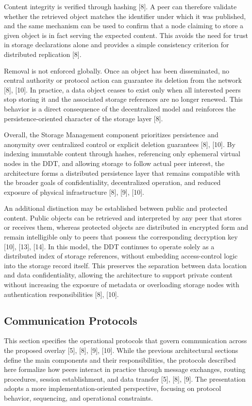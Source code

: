 \documentclass[12pt,a4paper]{article}
\begin{document}
Content integrity is verified through hashing [8]. A peer can therefore validate whether the retrieved object matches the identifier under which it was published, and the same mechanism can be used to confirm that a node claiming to store a given object is in fact serving the expected content. This avoids the need for trust in storage declarations alone and provides a simple consistency criterion for distributed replication [8].

Removal is not enforced globally. Once an object has been disseminated, no central authority or protocol action can guarantee its deletion from the network [8], [10]. In practice, a data object ceases to exist only when all interested peers stop storing it and the associated storage references are no longer renewed. This behavior is a direct consequence of the decentralized model and reinforces the persistence-oriented character of the storage layer [8].

Overall, the Storage Management component prioritizes persistence and anonymity over centralized control or explicit deletion guarantees [8], [10]. By indexing immutable content through hashes, referencing only ephemeral virtual nodes in the DDT, and allowing storage to follow actual peer interest, the architecture forms a distributed persistence layer that remains compatible with the broader goals of confidentiality, decentralized operation, and reduced exposure of physical infrastructure [8], [9], [10].

An additional distinction may be established between public and protected content. Public objects can be retrieved and interpreted by any peer that stores or receives them, whereas protected objects are distributed in encrypted form and remain intelligible only to peers that possess the corresponding decryption key [10], [13], [14]. In this model, the DDT continues to operate solely as a distributed index of storage references, without embedding access-control logic into the storage record itself. This preserves the separation between data location and data confidentiality, allowing the architecture to support private content without increasing the exposure of metadata or overloading storage nodes with authentication responsibilities [8], [10].

\subsection{Communication Protocols}

This section specifies the operational protocols that govern communication across the proposed overlay [5], [8], [9], [10]. While the previous architectural sections define the main components and their responsibilities, the protocols described here formalize how peers interact in practice through message exchanges, routing procedures, session establishment, and data transfer [5], [8], [9]. The presentation adopts a more implementation-oriented perspective, focusing on protocol behavior, sequencing, and operational constraints.
\end{document}
